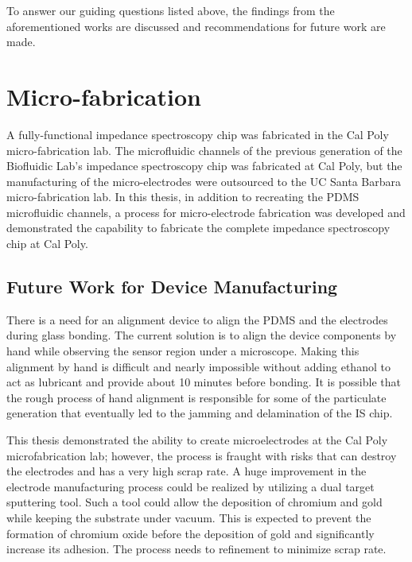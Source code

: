 \par To answer our guiding questions listed above, the findings from the aforementioned works are discussed and recommendations for future work are made.
    


\section{Micro-fabrication}

\par A fully-functional impedance spectroscopy chip was fabricated in the Cal Poly micro-fabrication lab. The microfluidic channels of the previous generation of the Biofluidic Lab's impedance spectroscopy chip was fabricated at Cal Poly, but the manufacturing of the micro-electrodes were outsourced to the UC Santa Barbara micro-fabrication lab. In this thesis, in addition to recreating the PDMS microfluidic channels, a process for micro-electrode fabrication was developed and demonstrated the capability to fabricate the complete impedance spectroscopy chip at Cal Poly.

\subsection{Future Work for Device Manufacturing}

\par There is a need for an alignment device to align the PDMS and the electrodes during glass bonding. The current solution is to align the device components by hand while observing the sensor region under a microscope. Making this alignment by hand is difficult and nearly impossible without adding ethanol to act as lubricant and provide about 10 minutes before bonding. It is possible that the rough process of hand alignment is responsible for some of the particulate generation that eventually led to the jamming and delamination of the IS chip. 

\par This thesis demonstrated the ability to create microelectrodes at the Cal Poly microfabrication lab; however, the process is fraught with risks that can destroy the electrodes and has a very high scrap rate. A huge improvement in the electrode manufacturing process could be realized by utilizing a dual target sputtering tool. Such a tool could allow the deposition of chromium and gold while keeping the substrate under vacuum. This is expected to prevent the formation of chromium oxide before the deposition of gold and significantly increase its adhesion. The process needs to refinement to minimize scrap rate. 


